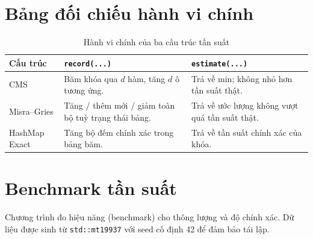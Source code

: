 

\section{Bảng đối chiếu hành vi chính}

\begin{table}[H]
\centering
\caption{Hành vi chính của ba cấu trúc tần suất}
\begin{tabularx}{\textwidth}{@{}p{3.2cm} >{\raggedright\arraybackslash}X >{\raggedright\arraybackslash}X@{}}
\toprule
Cấu trúc & \texttt{record(...)} & \texttt{estimate(...)} \\
\midrule
CMS & Băm khóa qua $d$ hàm, tăng $d$ ô tương ứng. & Trả về min; không nhỏ hơn tần suất thật. \\
Misra--Gries & Tăng / thêm mới / giảm toàn bộ tuỳ trạng thái bảng. & Trả về ước lượng không vượt quá tần suất thật. \\
HashMap Exact & Tăng bộ đếm chính xác trong bảng băm. & Trả về tần suất chính xác của khóa. \\
\bottomrule
\end{tabularx}
\end{table}

\section{Benchmark tần suất}

Chương trình đo hiệu năng (benchmark) cho thông lượng và độ chính xác. Dữ liệu được sinh từ \texttt{std::mt19937} với seed cố định 42 để đảm bảo tái lập.


